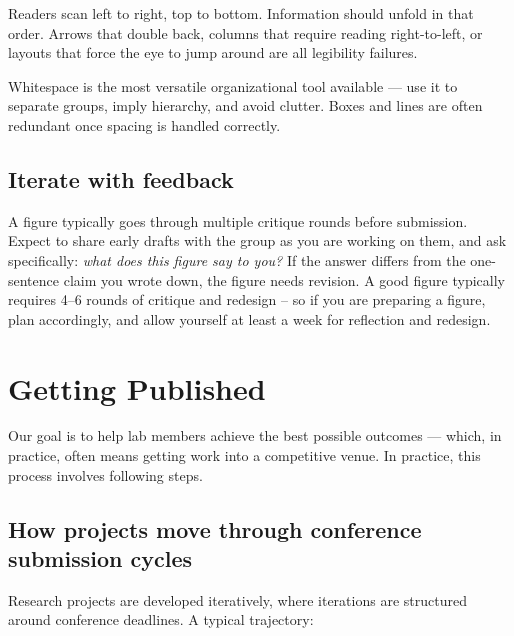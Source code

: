 \documentclass[11pt, letterpaper]{article}
\begin{document}
Readers scan left to right, top to bottom. Information should unfold in that 
order. Arrows that double back, columns that require reading right-to-left, or 
layouts that force the eye to jump around are all legibility failures. 

Whitespace is the most versatile organizational tool available --- use it to 
separate groups, imply hierarchy, and avoid clutter. Boxes and lines are often 
redundant once spacing is handled correctly.

\subsection{Iterate with feedback}

A figure typically goes through multiple critique rounds before submission. 
Expect to share early drafts with the group as you are working on them, and ask specifically: \emph{what does this figure say to you?} If the answer differs from the one-sentence claim you wrote 
down, the figure needs revision. A good figure typically requires 4--6 rounds 
of critique and redesign -- so if you are preparing a figure, plan accordingly, and allow yourself at least a week for reflection and redesign.




\section{Getting Published}
 
Our goal is to help lab members achieve the best possible outcomes --- which, in practice, often means getting work into a competitive venue. In practice, this process involves following steps.

\subsection{How projects move through conference submission cycles}
 
Research projects are developed iteratively, where iterations are structured around conference deadlines. A typical trajectory: 
\end{document}

